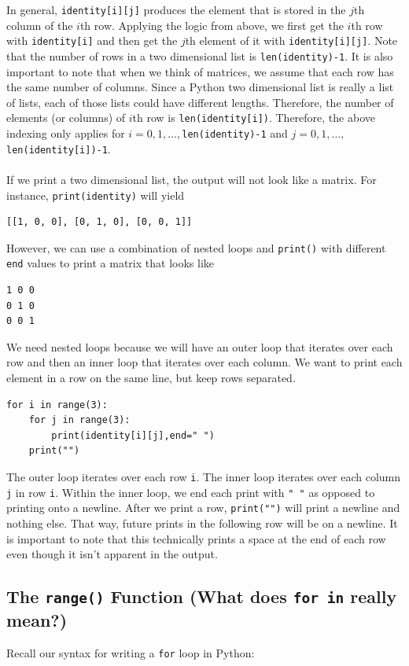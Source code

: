 \documentclass{article}
\begin{document}
In general, \texttt{identity[i][j]} produces the element that is stored in the $j$th column of the $i$th row. Applying the logic from above, we first get the $i$th row with \texttt{identity[i]} and then get the $j$th element of it with \texttt{identity[i][j]}. Note that the number of rows in a two dimensional list is \texttt{len(identity)-1}. It is also important to note that when we think of matrices, we assume that each row has the same number of columns. Since a Python two dimensional list is really a list of lists, each of those lists could have different lengths. Therefore, the number of elements (or columns) of $i$th row is \texttt{len(identity[i])}. Therefore, the above indexing only applies for $i=0,1,\dots,$\texttt{len(identity)-1} and $j=0,1,\dots,$\texttt{len(identity[i])-1}.\\\\
If we print a two dimensional list, the output will not look like a matrix. For instance, \texttt{print(identity)} will yield
\begin{verbatim}
[[1, 0, 0], [0, 1, 0], [0, 0, 1]]
\end{verbatim}
However, we can use a combination of nested loops and \texttt{print()} with different \texttt{end} values to print a matrix that looks like
\begin{verbatim}
1 0 0
0 1 0
0 0 1
\end{verbatim}
We need nested loops because we will have an outer loop that iterates over each row and then an inner loop that iterates over each column. We want to print each element in a row on the same line, but keep rows separated.
\begin{verbatim}
for i in range(3):
    for j in range(3):
        print(identity[i][j],end=" ")
    print("")
\end{verbatim}
The outer loop iterates over each row \texttt{i}. The inner loop iterates over each column \texttt{j} in row \texttt{i}. Within the inner loop, we end each print with \texttt{" "} as opposed to printing onto a newline. After we print a row, \texttt{print("")} will print a newline and nothing else. That way, future prints in the following row will be on a newline. It is important to note that this technically prints a space at the end of each row even though it isn't apparent in the output.

\subsection{The \texttt{range()} Function (What does \texttt{for in} really mean?)}
Recall our syntax for writing a \texttt{for} loop in Python: 
\end{document}
